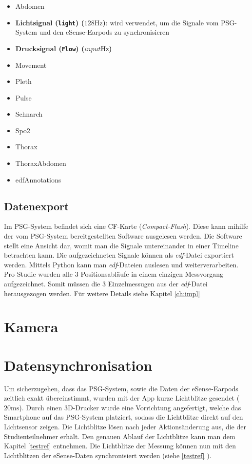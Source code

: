 \begin{itemize}
    \item Abdomen
    \item \textbf{Lichtsignal (\texttt{light}) ($128 \si{\hertz}$)}: wird verwendet, um die Signale vom PSG-System und den eSense-Earpods zu synchronisieren
    \item \textbf{Drucksignal (\texttt{Flow}) ($input \si{\hertz}$)}
    \item Movement
    \item Pleth
    \item Pulse
    \item Schnarch
    \item Spo2
    \item Thorax
    \item ThoraxAbdomen
    \item edfAnnotations
\end{itemize}

\subsection{Datenexport}
\label{ch:sa:psg:export}

Im PSG-System befindet sich eine CF-Karte (\textit{Compact-Flash}). Diese kann mihilfe der vom PSG-System bereitgestellten Software \glqq {}\grqq ausgelesen werden.
Die Software stellt eine Ansicht dar, womit man die Signale untereinander in einer Timeline betrachten kann. Die aufgezeichneten Signale können als \textit{edf}-Datei exportiert werden.
Mittels Python kann man \textit{edf}-Dateien auslesen und weiterverarbeiten.
Pro Studie wurden alle 3 Positionsabläufe in einem einzigen Messvorgang aufgezeichnet. Somit müssen die 3 Einzelmessugen aus der \textit{edf}-Datei herausgezogen werden.
Für weitere Details siehe Kapitel \ref{ch:impl} 

\section{Kamera}
\label{ch:sa:camera}

\section{Datensynchronisation}
\label{ch:sa:data_synchronisation}
Um sicherzugehen, dass das PSG-System, sowie die Daten der eSense-Earpods zeitlich exakt übereinstimmt, wurden mit der App kurze Lichtblitze gesendet ($20 \si{\ms}$).
Durch einen 3D-Drucker wurde eine Vorrichtung angefertigt, welche das Smartphone auf das PSG-System platziert, sodass die Lichtblitze direkt auf den Lichtsensor zeigen.
Die Lichtblitze lösen nach jeder Aktionsänderung aus, die der Studienteilnehmer erhält. 
Den genauen Ablauf der Lichtblitze kann man dem Kapitel \ref{testref} entnehmen.
Die Lichtblitze der Messung können nun mit den Lichtblitzen der eSense-Daten synchronisiert werden (siehe \ref{testref} ).

